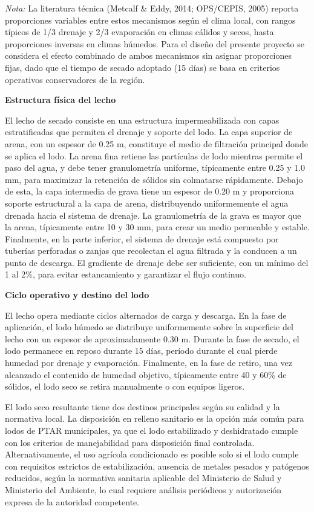 \documentclass[12pt,a4paper]{article}
\begin{document}
\textit{Nota:} La literatura técnica (Metcalf \& Eddy, 2014; OPS/CEPIS, 2005) reporta proporciones variables entre estos mecanismos según el clima local, con rangos típicos de 1/3 drenaje y 2/3 evaporación en climas cálidos y secos, hasta proporciones inversas en climas húmedos. Para el diseño del presente proyecto se considera el efecto combinado de ambos mecanismos sin asignar proporciones fijas, dado que el tiempo de secado adoptado (15 días) se basa en criterios operativos conservadores de la región.

\textbf{Estructura física del lecho}

El lecho de secado consiste en una estructura impermeabilizada con capas estratificadas que permiten el drenaje y soporte del lodo. La capa superior de arena, con un espesor de 0.25 m, constituye el medio de filtración principal donde se aplica el lodo. La arena fina retiene las partículas de lodo mientras permite el paso del agua, y debe tener granulometría uniforme, típicamente entre 0.25 y 1.0 mm, para maximizar la retención de sólidos sin colmatarse rápidamente. Debajo de esta, la capa intermedia de grava tiene un espesor de 0.20 m y proporciona soporte estructural a la capa de arena, distribuyendo uniformemente el agua drenada hacia el sistema de drenaje. La granulometría de la grava es mayor que la arena, típicamente entre 10 y 30 mm, para crear un medio permeable y estable. Finalmente, en la parte inferior, el sistema de drenaje está compuesto por tuberías perforadas o zanjas que recolectan el agua filtrada y la conducen a un punto de descarga. El gradiente de drenaje debe ser suficiente, con un mínimo del 1 al 2\%, para evitar estancamiento y garantizar el flujo continuo.

\textbf{Ciclo operativo y destino del lodo}

El lecho opera mediante ciclos alternados de carga y descarga. En la fase de aplicación, el lodo húmedo se distribuye uniformemente sobre la superficie del lecho con un espesor de aproximadamente 0.30 m. Durante la fase de secado, el lodo permanece en reposo durante 15 días, período durante el cual pierde humedad por drenaje y evaporación. Finalmente, en la fase de retiro, una vez alcanzado el contenido de humedad objetivo, típicamente entre 40 y 60\% de sólidos, el lodo seco se retira manualmente o con equipos ligeros.

El lodo seco resultante tiene dos destinos principales según su calidad y la normativa local. La disposición en relleno sanitario es la opción más común para lodos de PTAR municipales, ya que el lodo estabilizado y deshidratado cumple con los criterios de manejabilidad para disposición final controlada. Alternativamente, el uso agrícola condicionado es posible solo si el lodo cumple con requisitos estrictos de estabilización, ausencia de metales pesados y patógenos reducidos, según la normativa sanitaria aplicable del Ministerio de Salud y Ministerio del Ambiente, lo cual requiere análisis periódicos y autorización expresa de la autoridad competente.
\end{document}

